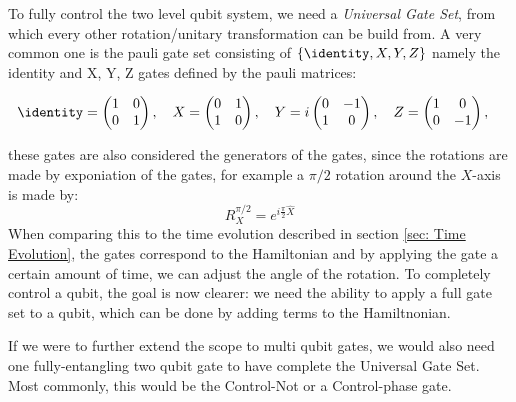 To fully control the two level qubit system, we need a \textit{Universal Gate Set}, from which every other rotation/unitary transformation can be build from. A very common one is the pauli gate set consisting of $\{\identity, X, Y, Z\}$ namely the identity and X, Y, Z gates defined by the pauli matrices:
\begin{fullwidth}
\begin{equation}
    \identity = \begin{pmatrix}
        1 & 0 \\ 
        0 & 1
    \end{pmatrix}, \quad
    X = \begin{pmatrix}
        0 & 1 \\ 
        1 & 0
    \end{pmatrix}, \quad
    Y = i\begin{pmatrix}
        0 & -1 \\ 
        1 & 0
    \end{pmatrix}, \quad
    Z = \begin{pmatrix}
        1 & 0 \\ 
        0 & -1
    \end{pmatrix}, \quad
\end{equation}
\end{fullwidth}
these gates are also considered the generators of the gates, since the rotations are made by exponiation of the gates, for example a $\pi/2$ rotation around the $X$-axis is made by: 
\begin{equation}
    R_X^{\pi/2} = e^{i \frac{\pi}{2} \hat{X}}    
\end{equation}
When comparing this to the time evolution described in section \ref{sec: Time Evolution}, the gates correspond to the Hamiltonian and by applying the gate a certain amount of time, we can adjust the angle of the rotation. To completely control a qubit, the goal is now clearer: we need the ability to apply a full gate set to a qubit, which can be done by adding terms to the Hamiltnonian. 

If we were to further extend the scope to multi qubit gates, we would also need one fully-entangling two qubit gate to have complete the Universal Gate Set. Most commonly, this would be the Control-Not or a Control-phase gate. \cite{krantz_quantum_2019} 


